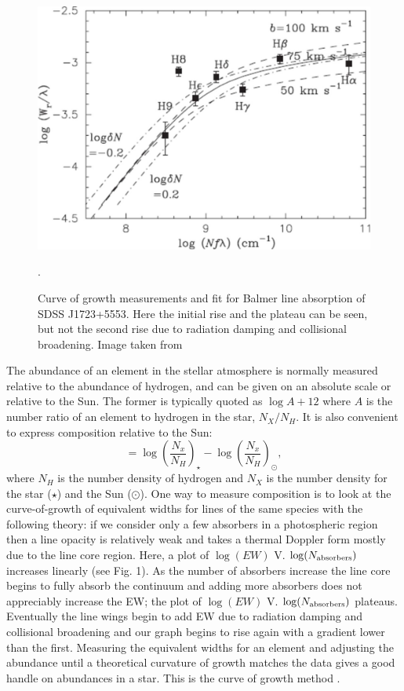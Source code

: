 \begin{figure}
    \centering
    \includegraphics{4-images/balmercurve.jpg}
    \caption{Curve of growth measurements and fit for Balmer line absorption of SDSS J1723+5553. Here the initial rise and the plateau can be seen, but not the second rise due to radiation damping and collisional broadening. Image taken from \protect\citet{2010PASJ...62.1333A}}.
    \label{fig:my_label}
\end{figure}

The abundance of an element in the stellar atmosphere is normally measured relative to the abundance of hydrogen, and can be given on an absolute scale or relative to the Sun. The former is typically quoted as $\log A + 12$ where $A$ is the number ratio of an element to hydrogen in the star, $N_X / N_H$. It is also convenient to express composition relative to the Sun:
%
\begin{equation}
    [X/H] = \log \left( \frac{N_x}{N_H} \right)_\star - \log \left( \frac{N_x}{N_H} \right)_\odot,
\end{equation}
%
where $N_H$ is the number density of hydrogen and $N_X$ is the number density for the star ($\star$) and the Sun ($\odot$). One way to measure composition is to look at the curve-of-growth of equivalent widths for lines of the same species with the following theory: if we consider only a few absorbers in a photospheric region then a line opacity is relatively weak and takes a thermal Doppler form mostly due to the line core region. Here, a plot of $\log (EW)$ V. $\log (N_{\rm absorbers})$ increases linearly (see Fig. 1). As the number of absorbers increase the line core begins to fully absorb the continuum and adding more absorbers does not appreciably increase the EW; the plot of $\log (EW)$ V. $\log (N_{\rm absorbers})$ plateaus. Eventually the line wings begin to add EW due to radiation damping and collisional broadening and our graph begins to rise again with a gradient lower than the first. Measuring the equivalent widths for an element and adjusting the abundance until a theoretical curvature of growth matches the data gives a good handle on abundances in a star. This is the curve of growth method \citep{1995gusu.book.....P}.


